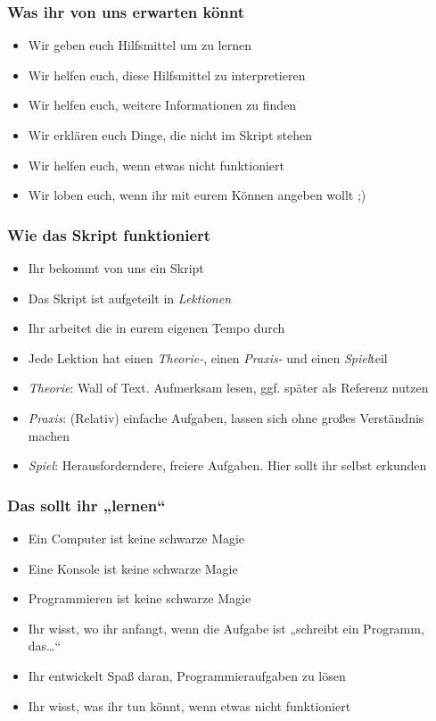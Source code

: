 \begin{frame}
	\frametitle{Was ihr von uns erwarten könnt}
	\begin{itemize}
		\item Wir geben euch Hilfsmittel um zu lernen
		      \pause\item Wir helfen euch, diese Hilfsmittel zu interpretieren
		      \pause\item Wir helfen euch, weitere Informationen zu finden
		      \pause\item Wir erklären euch Dinge, die nicht im Skript stehen
		      \pause\item Wir helfen euch, wenn etwas nicht funktioniert
		      \pause\item Wir loben euch, wenn ihr mit eurem Können angeben wollt ;)
	\end{itemize}
\end{frame}

\begin{frame}
	\frametitle{Wie das Skript funktioniert}
	\begin{itemize}
		\item Ihr bekommt von uns ein Skript
		      \pause\item Das Skript ist aufgeteilt in \emph{Lektionen}
		      \pause\item Ihr arbeitet die in eurem eigenen Tempo durch
		      \pause\item Jede Lektion hat einen \emph{Theorie-}, einen
		      \emph{Praxis-} und einen \emph{Spiel}teil
		      \pause\item \emph{Theorie}: Wall of Text. Aufmerksam lesen, ggf. später
		      als Referenz nutzen
		      \pause\item \emph{Praxis}: (Relativ) einfache Aufgaben, lassen sich
		      ohne großes Verständnis machen
		      \pause\item \emph{Spiel}: Herausforderndere, freiere Aufgaben. Hier
		      sollt ihr selbst erkunden
	\end{itemize}
\end{frame}

\begin{frame}
	\frametitle{Das sollt ihr „lernen“}
	\begin{itemize}
		\item Ein Computer ist keine schwarze Magie
		      \pause\item Eine Konsole ist keine schwarze Magie
		      \pause\item Programmieren ist keine schwarze Magie
		      \pause\item Ihr wisst, wo ihr anfangt, wenn die Aufgabe ist „schreibt
		      ein Programm, das\dots“
		      \pause\item Ihr entwickelt Spaß daran, Programmieraufgaben zu lösen
		      \pause\item Ihr wisst, was ihr tun könnt, wenn etwas nicht funktioniert
	\end{itemize}
\end{frame}

